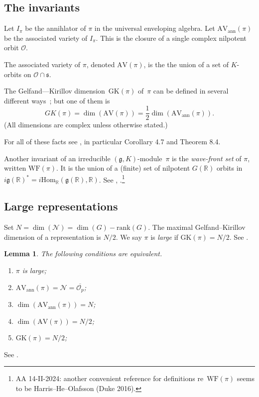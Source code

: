 \documentclass[10pt,leqno]{article}
\newtheorem{lemma}[equation]{Lemma}
\newcommand{\Hom}{\mathrm{Hom}}
\renewcommand{\O}{\mathcal O}
\newcommand{\R}{\mathbb R}
\newcommand{\N}{\mathcal N}
\newcommand{\g}{\mathfrak g}
\newcommand{\s}{\mathfrak s}
\newcommand{\AV}{\mathrm{AV}}
\newcommand{\WF}{\mathrm{WF}}
\newcommand{\AVann}{\mathrm{AV}_{\mathrm{ann}}}
\newcommand{\GK}{\mathrm{GK}}
\newcommand{\Op}{\O_p}
\begin{document}
 \subsection{The invariants}


Let $I_\pi$ be the annihlator of $\pi$ in the universal enveloping algebra.
Let $\AVann(\pi)$ be the associated variety of $I_\pi$. 
This is the closure of a single complex nilpotent orbit $\O$.

The associated variety of $\pi$, denoted $\AV(\pi)$, is the  the union of a set of
$K$-orbits on $\O\cap\s$.

The Gelfand---Kirillov dimension~$\GK(\pi)$ of~$\pi$ can be defined in several different ways~\cite{vogan-gelfand-kirillov}; but one of them is
$$
GK(\pi)=\dim(\AV(\pi))=\frac12\dim(\AVann(\pi)).
$$
(All dimensions are complex unless otherwise stated.)

For all of these facts see \cite{vogan_bowdoin}, in particular Corollary 4.7 and Theorem 8.4.

Another invariant of an irreducible $(\g, K)$-module~$\pi$ is the \emph{wave-front set} of $\pi$, written $\WF(\pi)$. It is the union of a (finite) set of nilpotent $G(\R)$ orbits in
$i\g(\R)^*=i\Hom_\R(\g(\R),\R)$. See \cite{howe_wave_front}, \cite{bv_local_structure}.\footnote{AA 14-II-2024: another convenient reference  for definitions re~$\WF(\pi)$ seems to be  Harris--He--Olafsson (Duke 2016).}

\subsection{Large representations} Set $N=\dim(\N)=\dim(G)-\mathrm{rank}(G)$. The maximal Gelfand--Kirillov dimension of a representation is $N/2$.
We say $\pi$ is {\it large} if $\GK(\pi)=N/2$. See \cite[Section~6]{Vogan78}. 


\begin{lemma}
  \label{l:large}
  The following conditions are equivalent.
  \begin{enumerate}
    \item $\pi$ is large;
\item $\AVann(\pi)=\N=\overline{\Op}$;
\item $\dim(\AVann(\pi))=N$;
  \item $\dim(\AV(\pi))=N/2$;
\item $\GK(\pi)=N/2$;

\end{enumerate}
\end{lemma}
See \cite{vogan_bowdoin}.
\end{document}

